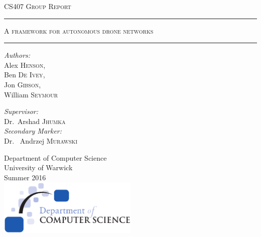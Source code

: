 \documentclass[10pt,a4paper,twoside]{report}
\begin{document}
\begin{titlepage}
\begin{center}

\textsc{\LARGE CS407 Group Report}\\[1.5cm]
\vspace{1.5cm}

\hrule
\vspace{0.2cm}
\textsc{\LARGE A framework for autonomous drone networks}\\
\vspace{0.2cm}
\hrule

\vspace{1.5cm}
\noindent
\begin{minipage}{0.4\textwidth}
	\begin{flushleft} \large
		\emph{Authors:}\\
		Alex \textsc{Henson}, \\ Ben \textsc{De Ivey}, \\ Jon \textsc{Gibson}, \\ William \textsc{Seymour} 
	\end{flushleft}
\end{minipage}%
\begin{minipage}{0.4\textwidth}
	\begin{flushright} \large
		\emph{Supervisor:} \\
		Dr.~Arshad \textsc{Jhumka} \\
		\emph{Secondary Marker:} \\
		Dr.~ Andrzej \textsc{Murawski} 
	\end{flushright}
\end{minipage}
\vfill
\large Department of Computer Science\\
\large University of Warwick\\
\large Summer 2016\\
\vfill
\includegraphics[width=0.50\textwidth]{img/dcslogo.png}~\\[1cm]
\end{center}
\end{titlepage}

\end{document}
